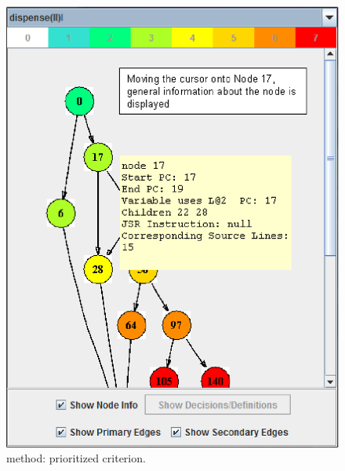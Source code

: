 
\begin{figure}[!ht]
\begin{center}
\includegraphics[height=0.35\textheight]{fig/dispenser-dug-edited.eps}
\caption{\label{fig:dispenser-dug} 
method: \DUG prioritized \wrt {} criterion.}
\end{center}
\end{figure}
